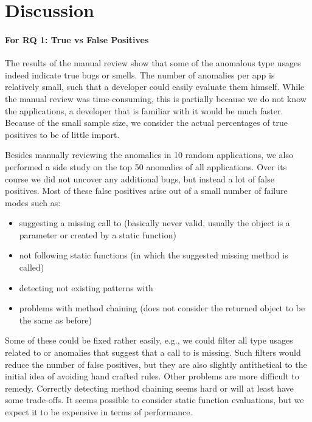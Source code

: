 \section{Discussion}\label{sc:disc}

\paragraph{For RQ 1: True vs False Positives}

The results of the manual review show that some of the anomalous type usages indeed indicate true bugs or smells.
The number of anomalies per app is relatively small, such that a developer could easily evaluate them himself.
While the manual review was time-consuming, this is partially because we do not know the applications, a developer that is familiar with it would be much faster.
Because of the small sample size, we consider the actual percentages of true positives to be of little import.

Besides manually reviewing the anomalies in 10 random applications, we also performed a side study on the top 50 anomalies of all applications.
Over its course we did not uncover any additional bugs, but instead a lot of false positives.
Most of these false positives arise out of a small number of failure modes such as:
\begin{itemize}
    \item suggesting a missing call to  (basically never valid, usually the object is a parameter or created by a static function)
    \item not following static functions (in which the suggested missing method is called)
    \item detecting not existing patterns with 
    \item problems with method chaining (does not consider the returned object to be the same as before)
\end{itemize}
Some of these could be fixed rather easily, e.g., we could filter all type usages related to  or anomalies that suggest that a call to  is missing.
Such filters would reduce the number of false positives, but they are also slightly antithetical to the initial idea of avoiding hand crafted rules.
Other problems are more difficult to remedy.
Correctly detecting method chaining seems hard or will at least have some trade-offs.
It seems possible to consider static function evaluations, but we expect it to be expensive in terms of performance.


